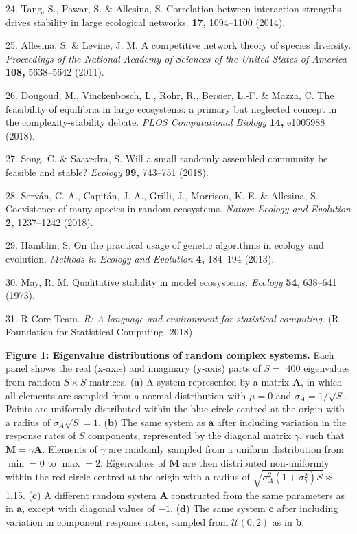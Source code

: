 \documentclass[]{article}
\begin{document}
\hypertarget{ref-Tang2014c}{}
24. Tang, S., Pawar, S. \& Allesina, S. Correlation between interaction
strengths drives stability in large ecological networks. \textbf{17,}
1094--1100 (2014).

\hypertarget{ref-Allesina2011}{}
25. Allesina, S. \& Levine, J. M. A competitive network theory of
species diversity. \emph{Proceedings of the National Academy of Sciences
of the United States of America} \textbf{108,} 5638--5642 (2011).

\hypertarget{ref-Dougoud2018}{}
26. Dougoud, M., Vinckenbosch, L., Rohr, R., Bersier, L.-F. \& Mazza, C.
The feasibility of equilibria in large ecosystems: a primary but
neglected concept in the complexity-stability debate. \emph{PLOS
Computational Biology} \textbf{14,} e1005988 (2018).

\hypertarget{ref-Song2018}{}
27. Song, C. \& Saavedra, S. Will a small randomly assembled community
be feasible and stable? \emph{Ecology} \textbf{99,} 743--751 (2018).

\hypertarget{ref-Servan2018}{}
28. Serván, C. A., Capitán, J. A., Grilli, J., Morrison, K. E. \&
Allesina, S. Coexistence of many species in random ecosystems.
\emph{Nature Ecology and Evolution} \textbf{2,} 1237--1242 (2018).

\hypertarget{ref-Hamblin2013}{}
29. Hamblin, S. On the practical usage of genetic algorithms in ecology
and evolution. \emph{Methods in Ecology and Evolution} \textbf{4,}
184--194 (2013).

\hypertarget{ref-May1973}{}
30. May, R. M. Qualitative stability in model ecosystems. \emph{Ecology}
\textbf{54,} 638--641 (1973).

\hypertarget{ref-Rproject}{}
31. R Core Team. \emph{R: A language and environment for statistical
computing}. (R Foundation for Statistical Computing, 2018).

\clearpage

\textbf{Figure 1: Eigenvalue distributions of random complex systems.}
Each panel shows the real (x-axis) and imaginary (y-axis) parts of
\(S =\) 400 eigenvalues from random \(S \times S\) matrices.
(\(\textbf{a}\)) A system represented by a matrix \(\mathbf{A}\), in
which all elements are sampled from a normal distribution with
\(\mu = 0\) and \(\sigma_{A} = 1/\sqrt{S}\). Points are uniformly
distributed within the blue circle centred at the origin with a radius
of \(\sigma_{A} \sqrt{S} = 1\). (\(\textbf{b}\)) The same system as
\(\textbf{a}\) after including variation in the response rates of \(S\)
components, represented by the diagonal matrix \(\gamma\), such that
\(\mathbf{M} = \gamma\mathbf{A}\). Elements of \(\gamma\) are randomly
sampled from a uniform distribution from \(\min = 0\) to \(\max = 2\).
Eigenvalues of \(\mathbf{M}\) are then distributed non-uniformly within
the red circle centred at the origin with a radius of
\(\sqrt{\sigma^{2}_{A}(1 + \sigma^{2}_{\gamma})S} \approx\) 1.15.
(\(\textbf{c}\)) A different random system \(\mathbf{A}\) constructed
from the same parameters as in \(\textbf{a}\), except with diagonal
values of \(-1\). (\(\textbf{d}\)) The same system \(\textbf{c}\) after
including variation in component response rates, sampled from
\(\mathcal{U}(0, 2)\) as in \(\textbf{b}\).
\end{document}
